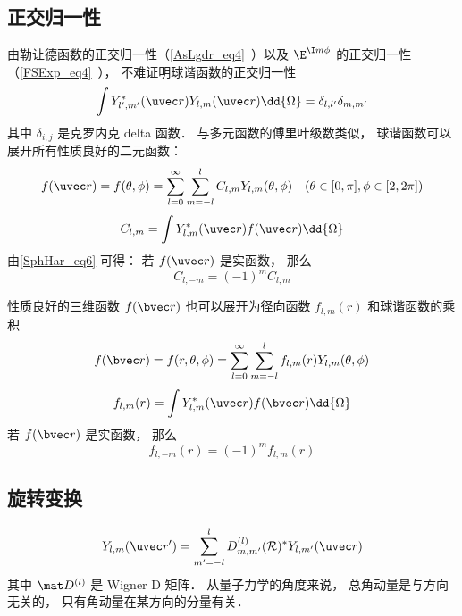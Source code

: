 \subsection{正交归一性}
由勒让德函数的正交归一性（\autoref{AsLgdr_eq4}~）以及 $\E^{\I m \phi}$  的正交归一性（\autoref{FSExp_eq4}~）， 不难证明球谐函数的正交归一性
\begin{equation}
\int Y_{l', m'}^*(\uvec r) Y_{l, m} (\uvec r) \dd{\Omega} = \delta_{l,l'}\delta_{m,m'}
\end{equation}
其中 $\delta_{i,j}$ 是克罗内克 delta 函数． 与多元函数的傅里叶级数类似， 球谐函数可以展开所有性质良好的二元函数：
\begin{equation}
f(\uvec r) = f(\theta, \phi) = \sum_{l = 0}^\infty\sum_{m=-l}^l C_{l,m}Y_{l,m}(\theta, \phi) \quad (\theta \in [0, \pi], \phi \in [2, 2\pi])
\end{equation}
\begin{equation}
C_{l,m} = \int Y^*_{l,m}(\uvec r) f(\uvec r) \dd{\Omega}
\end{equation}
由\autoref{SphHar_eq6} 可得： 若 $f(\uvec r)$ 是实函数， 那么
\begin{equation}
C_{l,-m} = (-1)^m C_{l,m}
\end{equation}

性质良好的三维函数 $f(\bvec r)$ 也可以展开为径向函数 $f_{l,m}(r)$ 和球谐函数的乘积
\begin{equation}\label{SphHar_eq9}
f(\bvec r) = f(r, \theta, \phi) = \sum_{l = 0}^\infty\sum_{m=-l}^l f_{l,m}(r) Y_{l,m}(\theta, \phi)
\end{equation}
\begin{equation}\label{SphHar_eq7}
f_{l,m}(r) = \int Y^*_{l,m}(\uvec r) f(\bvec r) \dd{\Omega}
\end{equation}
若 $f(\bvec r)$ 是实函数， 那么
\begin{equation}
f_{l,-m}(r) = (-1)^m f_{l,m}(r)
\end{equation}

\subsection{旋转变换}
\begin{equation}
Y_{l,m}(\uvec r') = \sum_{m'=-l}^l D_{m,m'}^{(l)} (\mathcal R)^* Y_{l,m'}(\uvec r)
\end{equation}
其中 $\mat D^{(l)}$ 是 Wigner D 矩阵． 从量子力学的角度来说， 总角动量是与方向无关的， 只有角动量在某方向的分量有关．

